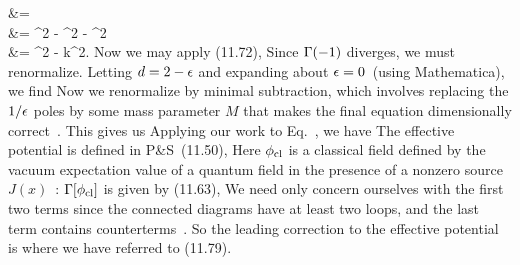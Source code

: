 {{ 		&= \det {} \\
 		&= \sig^2 - \kso^2 - \ksq^2 \\
 		&= \sig^2 - k^2.
 	}
 	Now we may apply (11.72),
 	Since $\Gamma(-1)$ diverges, we must renormalize.  Letting $d = 2 - \epsilon$ and expanding about $\epsilon = 0$~(using Mathematica), we find
 	Now we renormalize by minimal subtraction, which involves replacing the $1 / \epsilon$ poles by some mass parameter $M$ that makes the final equation dimensionally correct~\cite[pp.~376--377]{Peskin}.  This gives us
  	Applying our work to Eq.~, we have
 	The effective potential is defined in P\&S~(11.50),
	Here $\phi_\text{cl}$ is a classical field defined by the vacuum expectation value of a quantum field in the presence of a nonzero source $J(x)$~\cite[p.~348]{Peskin}:
	$\Gamma[\phi_\text{cl}]$ is given by (11.63),
 	We need only concern ourselves with the first two terms since the connected diagrams have at least two loops, and the last term contains counterterms~\cite[p.~372]{Peskin}.  So the leading correction to the effective potential is
 	where we have referred to (11.79).
}



